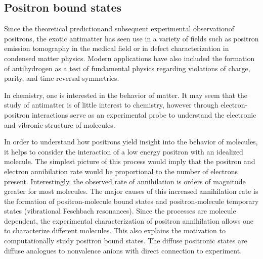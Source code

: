 \subsection{Positron bound states}
Since the theoretical prediction\citehere and subsequent experimental observation\citehere of positrons, the exotic antimatter has seen use in a variety of fields such as positron emission tomography in the medical field or in defect characterization in condensed matter physics.\citehere
Modern applications have also included the formation of antihydrogen as a test of fundamental physics regarding violations of charge, parity, and time-reversal symmetries.\citehere

In chemistry, one is interested in the behavior of matter.
It may seem that the study of antimatter is of little interest to chemistry, however through electron-positron interactions serve as an experimental probe to understand the electronic and vibronic structure of molecules.

In order to understand how positrons yield insight into the behavior of molecules, it helps to consider the interaction of a low energy positron with an idealized molecule.
The simplest picture of this process would imply that the positron and electron annihilation rate would be proportional to the number of electrons present.\citehere %
Interestingly, the observed rate of annihilation is orders of magnitude greater for most molecules.\citehere %
The major causes of this increased annihilation rate is the formation of positron-molecule bound states and positron-molecule temporary states (vibrational Feschbach resonances).\citehere
Since the processes are molecule dependent, the experimental characterization of positron annihilation allows one to characterize different molecules.
This also explains the motivation to computationally study positron bound states.
The diffuse positronic states are diffuse analogues to nonvalence anions with direct connection to experiment.
